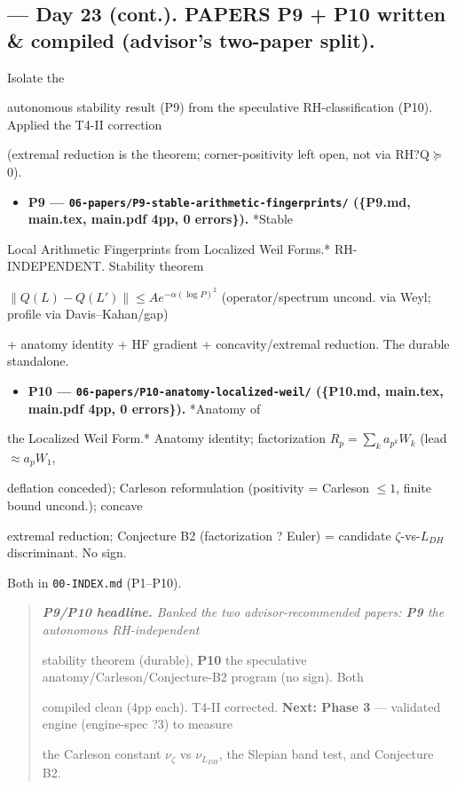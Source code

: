 \documentclass[10pt]{article}
\begin{document}
\subsection*{ --- Day 23 (cont.). PAPERS P9 + P10 written \& compiled (advisor's two-paper split).}
Isolate the\par
autonomous stability result (P9) from the speculative RH-classification (P10). Applied the T4-II correction\par
(extremal reduction is the theorem; corner-positivity left open, not via RH?Q\ensuremath{\succeq}0).\par
\begin{itemize}
\item \textbf{P9 --- \texttt{06-papers/P9-stable-arithmetic-fingerprints/} (\{P9.md, main.tex, main.pdf 4pp, 0 errors\}).} *Stable
\end{itemize}
  Local Arithmetic Fingerprints from Localized Weil Forms.* RH-INDEPENDENT. Stability theorem\par
  $\|Q(L)-Q(L')\|\le Ae^{-\alpha(\log P)^2}$ (operator/spectrum uncond. via Weyl; profile via Davis--Kahan/gap)\par
  + anatomy identity + HF gradient + concavity/extremal reduction. The durable standalone.\par
\begin{itemize}
\item \textbf{P10 --- \texttt{06-papers/P10-anatomy-localized-weil/} (\{P10.md, main.tex, main.pdf 4pp, 0 errors\}).} *Anatomy of
\end{itemize}
  the Localized Weil Form.* Anatomy identity; factorization $R_p=\sum_k a_{p^k}W_k$ (lead $\approx a_pW_1$,\par
  deflation conceded); Carleson reformulation (positivity = Carleson $\le1$, finite bound uncond.); concave\par
  extremal reduction; Conjecture B2 (factorization ? Euler) = candidate \ensuremath{\zeta}-vs-$L_{DH}$ discriminant. No sign.\par
  Both in \texttt{00-INDEX.md} (P1--P10).\par

\begin{quote}\itshape
\textbf{P9/P10 headline.} Banked the two advisor-recommended papers: \textbf{P9} the autonomous RH-independent\par
stability theorem (durable), \textbf{P10} the speculative anatomy/Carleson/Conjecture-B2 program (no sign). Both\par
compiled clean (4pp each). T4-II corrected. \textbf{Next: Phase 3} --- validated engine (engine-spec ?3) to measure\par
the Carleson constant $\nu_\zeta$ vs $\nu_{L_{DH}}$, the Slepian band test, and Conjecture B2.\par
\end{quote}
\end{document}
